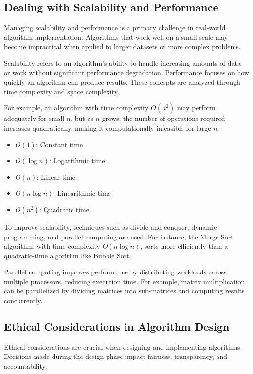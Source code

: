 \documentclass[12pt]{book} %
\begin{document}
\subsection{Dealing with Scalability and Performance}
Managing scalability and performance is a primary challenge in real-world algorithm implementation. Algorithms that work well on a small scale may become impractical when applied to larger datasets or more complex problems.

Scalability refers to an algorithm's ability to handle increasing amounts of data or work without significant performance degradation. Performance focuses on how quickly an algorithm can produce results. These concepts are analyzed through time complexity and space complexity.

For example, an algorithm with time complexity $O(n^2)$ may perform adequately for small $n$, but as $n$ grows, the number of operations required increases quadratically, making it computationally infeasible for large $n$.

\begin{itemize}
    \item $O(1)$: Constant time
    \item $O(\log n)$: Logarithmic time
    \item $O(n)$: Linear time
    \item $O(n \log n)$: Linearithmic time
    \item $O(n^2)$: Quadratic time
\end{itemize}

To improve scalability, techniques such as divide-and-conquer, dynamic programming, and parallel computing are used. For instance, the Merge Sort algorithm, with time complexity $O(n \log n)$, sorts more efficiently than a quadratic-time algorithm like Bubble Sort.

Parallel computing improves performance by distributing workloads across multiple processors, reducing execution time. For example, matrix multiplication can be parallelized by dividing matrices into sub-matrices and computing results concurrently.

\subsection{Ethical Considerations in Algorithm Design}
Ethical considerations are crucial when designing and implementing algorithms. Decisions made during the design phase impact fairness, transparency, and accountability.
\end{document}
